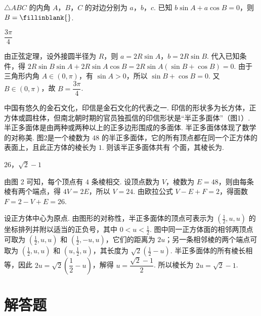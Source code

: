 \begin{problem}
\(\triangle ABC\) 的内角 \(A\)，\(B\)，\(C\) 的对边分别为 \(a\)，\(b\)，\(c\). 已知 \(b\sin A+a\cos B=0\)，则 \(B=\fillinblank{}\).
\end{problem}

\begin{answer}
\(\dfrac{3\pi}{4}\)
\end{answer}

\begin{solution}
由正弦定理，设外接圆半径为 \(R\)，则 \(a=2R\sin A\)，\(b=2R\sin B\). 代入已知条件，得 \(2R\sin B\sin A+2R\sin A\cos B=2R\sin A(\sin B+\cos B)=0\). 由于三角形内角 \(A\in(0,\pi)\)，有 \(\sin A>0\)，所以 \(\sin B+\cos B=0\). 又 \(B\in(0,\pi)\)，故 \(B=\dfrac{3\pi}{4}\).
\end{solution}

\begin{problem}
中国有悠久的金石文化，印信是金石文化的代表之一. 印信的形状多为长方体，正方体或圆柱体，但南北朝时期的官员独孤信的印信形状是“半正多面体”（图1）. 半正多面体是由两种或两种以上的正多边形围成的多面体. 半正多面体体现了数学的对称美. 图2是一个棱数为 \(48\) 的半正多面体，它的所有顶点都在同一个正方体的表面上，且此正方体的棱长为 \(1\). 则该半正多面体共有\fillinblank{} 个面，其棱长为\fillinblank{}.

\end{problem}

\begin{answer}
\(26\)，\(\sqrt{2}-1\)
\end{answer}

\begin{solution}
由图 2 可知，每个顶点有 \(4\) 条棱相交. 设顶点数为 \(V\)，棱数为 \(E=48\)，则由每条棱有两个端点，得 \(4V=2E\)，所以 \(V=24\). 由欧拉公式 \(V-E+F=2\)，得面数 \(F=2-V+E=26\).

设正方体中心为原点. 由图形的对称性，半正多面体的顶点可表示为 \((\frac12,u,u)\) 的坐标排列并附以适当的正负号，其中 \(0<u<\frac12\). 图中同一正方体面的相邻两顶点可取为 \((\frac12,u,u)\) 和 \((\frac12,-u,u)\)，它们的距离为 \(2u\)；另一条相邻棱的两个端点可取为 \((\frac12,u,u)\) 和 \((u,\frac12,u)\)，其长度为 \(\sqrt2\left(\frac12-u\right)\). 半正多面体的所有棱长相等，因此 \(2u=\sqrt2\left(\dfrac12-u\right)\)，解得 \(u=\dfrac{\sqrt2-1}{2}\). 所以棱长为 \(2u=\sqrt2-1\).
\end{solution}

\section{解答题}

